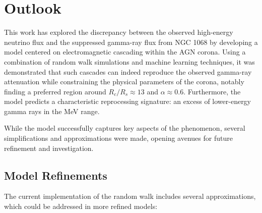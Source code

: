 \chapter{Outlook}
\label{chap:Outlook}

This work has explored the discrepancy between the observed high-energy neutrino flux and the suppressed gamma-ray flux from NGC 1068 by developing a model centered on electromagnetic cascading within the AGN corona. Using a combination of random walk simulations and machine learning techniques, it was demonstrated that such cascades can indeed reproduce the observed gamma-ray attenuation while constraining the physical parameters of the corona, notably finding a preferred region around $R_c/R_s \approx 13$ and $\alpha \approx 0.6$. Furthermore, the model predicts a characteristic reprocessing signature: an excess of lower-energy gamma rays in the MeV range.

While the model successfully captures key aspects of the phenomenon, several simplifications and approximations were made, opening avenues for future refinement and investigation.

\section{Model Refinements}

The current implementation of the random walk includes several approximations, which could be addressed in more refined models:

